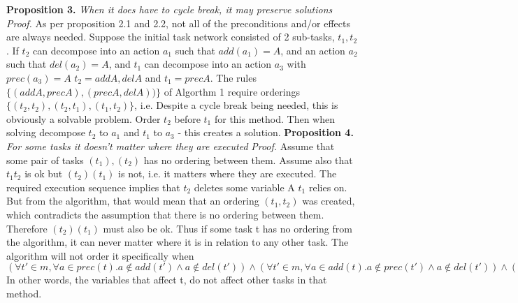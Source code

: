 \textbf{Proposition 3.} \textit{When it does have to cycle break, it may preserve solutions} \newline
\textit{Proof.}
As per proposition 2.1 and 2.2, not all of the preconditions and/or effects are always needed. Suppose the initial task network consisted of 2 sub-tasks, $t_1, t_2$. If $t_2$ can decompose into an action $a_1$ such that $add(a_1) = A$, and an action $a_2$ such that $del(a_2) = A$,
and $t_1$ can decompose into an action $a_3$ with $prec(a_3) = A$
$t_2 = {add A, del A}$ and $t_1 = {prec A}$. The rules $\{(add A, prec A), (prec A, del A))\}$ of Algorthm 1
require orderings $\{(t_2, t_2), (t_2, t_1), (t_1, t_2)\}$, i.e.
Despite a cycle break being needed, this is obviously a solvable problem. Order $t_2$ before $t_1$ for this method.
Then when solving decompose $t_2$ to $a_1$ and $t_1$ to $a_3$ - this creates a solution. \newline \newline
\textbf{Proposition 4.} \textit{For some tasks it doesn't matter where they are executed} \newline
\textit{Proof.}
Assume that some pair of tasks $(t_1), (t_2)$ has no ordering between them. Assume also that $t_1 t_2$ is ok but $(t_2) (t_1)$ is not, i.e.
it matters where they are executed.  \newline  \newline
The required execution sequence implies that $t_2$ deletes some variable A $t_1$ relies on. But from the algorithm,
that would mean that an ordering $(t_1, t_2)$ was created, which contradicts the assumption that there is no ordering between them.
Therefore $(t_2)(t_1)$ must also be ok. \newline  \newline
Thus if some task t has no ordering from the algorithm, it can never matter where it is in relation to any other task.
The algorithm will not order it specifically when $(\forall t' \in m, \forall a \in prec(t). a \notin add(t') \land a \notin del(t'))
\land  (\forall t' \in m, \forall a \in add(t). a \notin prec(t') \land a \notin del(t')) 
\land  (\forall t' \in m, \forall a \in del(t). a \notin add(t') \land a \notin prec(t'))$
In other words, the variables that affect t, do not affect other tasks in that method.




